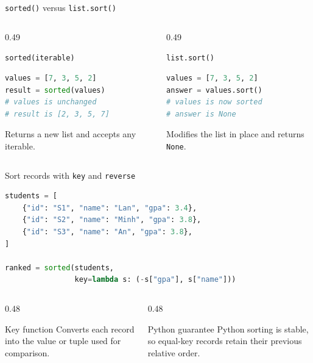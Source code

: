 \documentclass[aspectratio=169]{beamer}
\begin{document}
\begin{frame}[fragile]{\texttt{sorted()} versus \texttt{list.sort()}}
  \begin{columns}[T]
    \begin{column}{0.49\textwidth}
      \begin{block}{\texttt{sorted(iterable)}}
\begin{lstlisting}[language=Python,basicstyle=\ttfamily\scriptsize]
values = [7, 3, 5, 2]
result = sorted(values)
# values is unchanged
# result is [2, 3, 5, 7]
\end{lstlisting}
        Returns a new list and accepts any iterable.
      \end{block}
    \end{column}
    \begin{column}{0.49\textwidth}
      \begin{exampleblock}{\texttt{list.sort()}}
\begin{lstlisting}[language=Python,basicstyle=\ttfamily\scriptsize]
values = [7, 3, 5, 2]
answer = values.sort()
# values is now sorted
# answer is None
\end{lstlisting}
        Modifies the list in place and returns \texttt{None}.
      \end{exampleblock}
    \end{column}
  \end{columns}
\end{frame}

\begin{frame}[fragile]{Sort records with \texttt{key} and \texttt{reverse}}
  \begin{lstlisting}[language=Python,basicstyle=\ttfamily\scriptsize]
students = [
    {"id": "S1", "name": "Lan", "gpa": 3.4},
    {"id": "S2", "name": "Minh", "gpa": 3.8},
    {"id": "S3", "name": "An", "gpa": 3.8},
]

ranked = sorted(students,
                key=lambda s: (-s["gpa"], s["name"]))
  \end{lstlisting}
  \begin{columns}[T]
    \begin{column}{0.48\textwidth}
      \begin{block}{Key function}
        Converts each record into the value or tuple used for comparison.
      \end{block}
    \end{column}
    \begin{column}{0.48\textwidth}
      \begin{exampleblock}{Python guarantee}
        Python sorting is stable, so equal-key records retain their previous
        relative order.
      \end{exampleblock}
    \end{column}
  \end{columns}
\end{frame}
\end{document}
